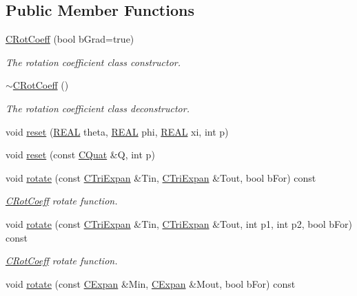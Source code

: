 \subsection*{Public Member Functions}
\begin{DoxyCompactItemize}
\item 
\hyperlink{classCRotCoeff_a5dae485fb061a3c231365159aefc9bb5}{C\-Rot\-Coeff} (bool b\-Grad=true)
\begin{DoxyCompactList}\small\item\em The rotation coefficient class constructor. \end{DoxyCompactList}\item 
\hyperlink{classCRotCoeff_a678f18f352f6fbb2f4ebf883be492c58}{$\sim$\-C\-Rot\-Coeff} ()
\begin{DoxyCompactList}\small\item\em The rotation coefficient class deconstructor. \end{DoxyCompactList}\item 
void \hyperlink{classCRotCoeff_aa52111e9c4cb2949dfae960437742536}{reset} (\hyperlink{util_8h_a5821460e95a0800cf9f24c38915cbbde}{R\-E\-A\-L} theta, \hyperlink{util_8h_a5821460e95a0800cf9f24c38915cbbde}{R\-E\-A\-L} phi, \hyperlink{util_8h_a5821460e95a0800cf9f24c38915cbbde}{R\-E\-A\-L} xi, int p)
\item 
void \hyperlink{classCRotCoeff_a6dea4a3900cc4ac8c012cc8790b92719}{reset} (const \hyperlink{classCQuat}{C\-Quat} \&Q, int p)
\item 
void \hyperlink{classCRotCoeff_a81aa02ca1487dab4a101741bae0debfb}{rotate} (const \hyperlink{classCTriExpan}{C\-Tri\-Expan} \&Tin, \hyperlink{classCTriExpan}{C\-Tri\-Expan} \&Tout, bool b\-For) const 
\begin{DoxyCompactList}\small\item\em \hyperlink{classCRotCoeff}{C\-Rot\-Coeff} rotate function. \end{DoxyCompactList}\item 
void \hyperlink{classCRotCoeff_a4bae6a8a4d9c8e215d7722b7de42f551}{rotate} (const \hyperlink{classCTriExpan}{C\-Tri\-Expan} \&Tin, \hyperlink{classCTriExpan}{C\-Tri\-Expan} \&Tout, int p1, int p2, bool b\-For) const 
\begin{DoxyCompactList}\small\item\em \hyperlink{classCRotCoeff}{C\-Rot\-Coeff} rotate function. \end{DoxyCompactList}\item 
void \hyperlink{classCRotCoeff_a2bad5246632d2a1b71c84a4cae8d03d6}{rotate} (const \hyperlink{classCExpan}{C\-Expan} \&Min, \hyperlink{classCExpan}{C\-Expan} \&Mout, bool b\-For) const 

\end{DoxyCompactItemize}
